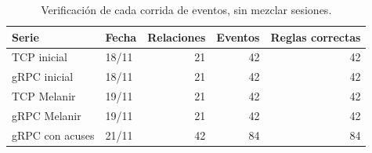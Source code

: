 \begin{table}[htbp]\centering\small
\caption{Verificación de cada corrida de eventos, sin mezclar sesiones.}
\begin{tabular}{llrrr}
\toprule
Serie & Fecha & Relaciones & Eventos & Reglas correctas \\
\midrule
TCP inicial & 18/11 & 21 & 42 & 42 \\
gRPC inicial & 18/11 & 21 & 42 & 42 \\
TCP Melanir & 19/11 & 21 & 42 & 42 \\
gRPC Melanir & 19/11 & 21 & 42 & 42 \\
gRPC con acuses & 21/11 & 42 & 84 & 84 \\
\bottomrule
\end{tabular}
\end{table}
